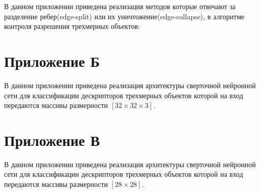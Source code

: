 \documentclass[14pt]{article}
\numberwithin{figure}{section}
\numberwithin{equation}{section}
\begin{document}
В данном приложении приведена реализация методов которые отвечают за разделение ребер(edge-split) или их уничтожение(edge-collapse), в алгоритме контроля разрешения трехмерных объектов:



\newpage
{}
\section*{Приложение Б}

В данном приложении приведена реализация архитектуры сверточной нейронной сети для классификации дескрипторов трехмерных объектов которой на вход передаются массивы размерности $[32 \times 32 \times 3]$.

 

\newpage
{}
\section*{Приложение В}

В данном приложении приведена реализация архитектуры сверточной нейронной сети для классификации дескрипторов трехмерных объектов которой на вход передаются массивы размерности $[28 \times 28]$.



\end{document}
